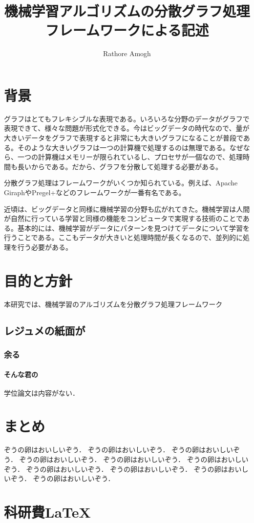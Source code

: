 \documentclass[]{iplresume} %
\title{機械学習アルゴリズムの分散グラフ処理フレームワークによる記述}
\author{Rathore Amogh}
\begin{document}
\maketitle
\section{背景}
グラフはとてもフレキシブルな表現である。いろいろな分野のデータがグラフで表現できて、様々な問題が形式化できる。今はビッグデータの時代なので、量が大きいデータをグラフで表現すると非常にも大きいグラフになることが普段である。そのような大きいグラフは一つの計算機で処理するのは無理である。なぜなら、一つの計算機はメモリーが限られているし、プロセサが一個なので、処理時間も長いからである。だから、グラフを分散して処理する必要がある。

分散グラフ処理はフレームワークがいくつか知られている。例えば、Apache GiraphやPregel+などのフレームワークが一番有名である。

近頃は、ビッグデータと同様に機械学習の分野も広がれてきた。機械学習は人間が自然に行っている学習と同様の機能をコンピュータで実現する技術のことである。基本的には、機械学習がデータにパターンを見つけてデータについて学習を行うことである。ここもデータが大きいと処理時間が長くなるので、並列的に処理を行う必要がある。

\section{目的と方針}
本研究では、機械学習のアルゴリズムを分散グラフ処理フレームワーク

\subsection{レジュメの紙面が}
\subsubsection{余る}
\paragraph{そんな君の}学位論文は内容がない．
\section{まとめ}
ぞうの卵はおいしいぞう．
ぞうの卵はおいしいぞう．
ぞうの卵はおいしいぞう．
ぞうの卵はおいしいぞう．
ぞうの卵はおいしいぞう．
ぞうの卵はおいしいぞう．
ぞうの卵はおいしいぞう．
ぞうの卵はおいしいぞう．
ぞうの卵はおいしいぞう．
ぞうの卵はおいしいぞう．

\appendix
\section{科研費\LaTeX}
\end{document}
